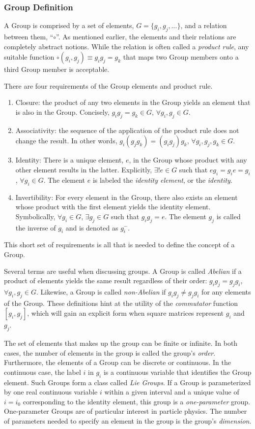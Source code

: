 \subsubsection{Group Definition}
A Group is comprised by a set of elements, $G=\{g_i,g_j,...\}$, and a relation between them, ``$\circ$''. 
As mentioned earlier, the elements and their relations are completely abstract notions.
While the relation is often called a \emph{product rule}, any suitable function $\circ(g_i,g_j)\equiv g_ig_j=g_k$ that maps two Group members onto a third Group member is acceptable.

There are four requirements of the Group elements and product rule.
\begin{enumerate}
    \item Closure: the product of any two elements in the Group yields an element that is also in the Group. Concisely, $g_ig_j=g_k\in G$, $\forall g_i,g_j\in G$.
    \item Associativity: the sequence of the application of the product rule does not change the result. In other words, $g_i(g_jg_k)=(g_ig_j)g_k$, $\forall g_i,g_j,g_k\in G$.
    \item Identity: There is a unique element, $e$, in the Group whose product with any other element results in the latter. Explicitly, $\exists!e\in G$ such that $eg_i=g_ie=g_i$, $\forall g_i\in G$. The element $e$ is labeled the \emph{identity element}, or the \emph{identity}.
    \item Invertibility: For every element in the Group, there also exists an element whose product with the first element yields the identity element. Symbolically, $\forall g_i\in G$, $\exists g_j\in G$ such that $g_ig_j=e$. The element $g_j$ is called the inverse of $g_i$ and is denoted as $g_i^{-}$.
\end{enumerate}
This short set of requirements is all that is needed to define the concept of a Group.

Several terms are useful when discussing groups.
A Group is called \emph{Abelian} if a product of elements yields the same result regardless of their order: $g_ig_j=g_jg_i$, $\forall g_i,g_j\in G$.
Likewise, a Group is called \emph{non-Abelian} if $g_ig_j\ne g_jg_i$ for any elements of the Group.
These definitions hint at the utility of the \emph{commutator} function $[g_i,g_j]$, which will gain an explicit form when square matrices represent $ g_i$ and $g_j$.

The set of elements that makes up the group can be finite or infinite.
In both cases, the number of elements in the group is called the group's \emph{order}.
Furthermore, the elements of a Group can be discrete or continuous.
In the continuous case, the label $i$ in $g_i$ is a continuous variable that identifies the Group element.
Such Groups form a class called \emph{Lie Groups}.
If a Group is parameterized by one real continuous variable $i$ within a given interval and a unique value of $i=i_0$ corresponding to the identity element, this group is a \emph{one-parameter} group. 
One-parameter Groups are of particular interest in particle physics.
The number of parameters needed to specify an element in the group is the group's \emph{dimension}.

